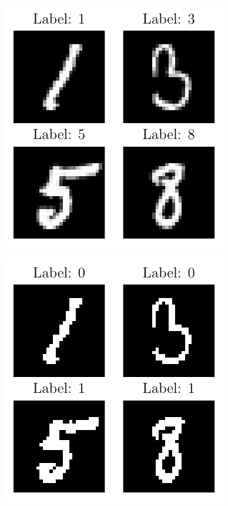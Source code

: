 \begin{figure}[!htb]
    \centering
  \begin{minipage}[b]{.4\linewidth}
      \includegraphics[width=.9\linewidth]{images/mnist_raw.pdf}
      \label{fig:mnist_dataset_original}
  \end{minipage}
  \begin{minipage}[b]{.4\linewidth}
      \includegraphics[width=.9\linewidth]{images/mnist_binarized.pdf}

\end{minipage}
\end{figure}
